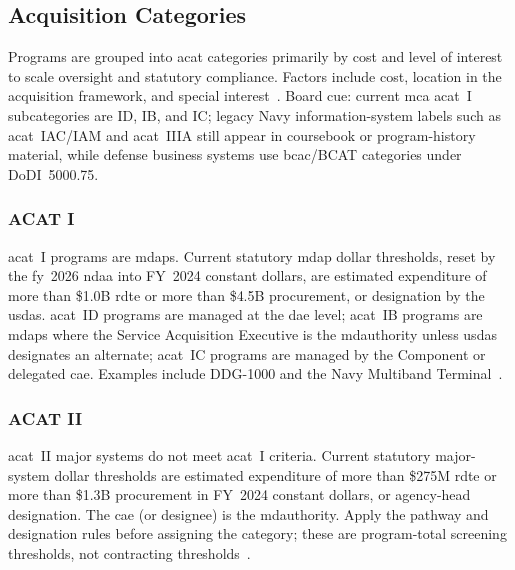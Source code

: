 \documentclass[../main.tex]{subfiles}
\begin{document}
\subsection{Acquisition Categories}
Programs are grouped into \ac{acat} categories primarily by cost and level of interest to scale oversight and statutory compliance. Factors include cost, location in the acquisition framework, and special interest~\autocite{DoDI5000-85,edo-3-3-1-acq-policy-players-2025}. Board cue: current \ac{mca} \ac{acat}~I subcategories are ID, IB, and IC; legacy Navy information-system labels such as \ac{acat}~IAC/IAM and \ac{acat}~IIIA still appear in coursebook or program-history material, while defense business systems use \ac{bcac}/BCAT categories under DoDI~5000.75.

\subsubsection{ACAT I}
\ac{acat}~I programs are \acp{mdap}. Current statutory \ac{mdap} dollar thresholds, reset by the \ac{fy}~2026 \ac{ndaa} into FY~2024 constant dollars, are estimated expenditure of more than \$1.0B \ac{rdte} or more than \$4.5B procurement, or designation by the \ac{usdas}. \ac{acat}~ID programs are managed at the \ac{dae} level; \ac{acat}~IB programs are \acp{mdap} where the Service Acquisition Executive is the \ac{mdauthority} unless \ac{usdas} designates an alternate; \ac{acat}~IC programs are managed by the Component or delegated \ac{cae}. Examples include DDG-1000 and the Navy Multiband Terminal~\autocite{DoDI5000-85,edo-3-3-1-acq-policy-players-2025,FY2026-NDAA,USC-10-4201-2026}.

\subsubsection{ACAT II}
\ac{acat}~II major systems do not meet \ac{acat}~I criteria. Current statutory major-system dollar thresholds are estimated expenditure of more than \$275M \ac{rdte} or more than \$1.3B procurement in FY~2024 constant dollars, or agency-head designation. The \ac{cae} (or designee) is the \ac{mdauthority}. Apply the pathway and designation rules before assigning the category; these are program-total screening thresholds, not contracting thresholds~\autocite{DoDI5000-85,USC-10-3041-2026}.
\end{document}
